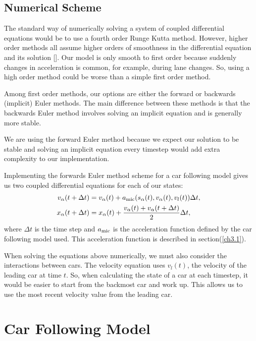 \documentclass[12pt]{article}
\begin{document}
    \subsection{Numerical Scheme}\label{num_sch}
    The standard way of numerically solving a system of coupled differential equations would be to use a fourth order Runge Kutta method.
    However, higher order methods all assume higher orders of smoothness in the differential equation and its solution [\cite{numerics}].
    Our model is only smooth to first order because suddenly changes in acceleration is common, for example, during lane changes. 
    So, using a high order method could be worse than a simple first order method.

    Among first order methods, our options are either the forward or backwards (implicit) Euler methods. The main difference between these methods is that the backwards Euler method involves solving an implicit equation and is generally more stable.

    We are using the forward Euler method because we expect our solution to be stable and solving an implicit equation every timestep would add extra complexity to our implementation.

    Implementing the forwards Euler method scheme for a car following model gives us two coupled differential equations for each of our states:
    \begin{align}
        v_\alpha(t+\Delta t) &= v_\alpha(t) +a_{\rm mic}(s_\alpha(t), v_\alpha (t), v_l (t))\Delta t, \label{num_eq1}\\
        x_\alpha(t + \Delta t) &= x_\alpha(t) + \frac{v_\alpha (t) + v_\alpha (t+\Delta t)}{2}\Delta t \label{num_eq2},
    \end{align}
    where $\Delta t$ is the time step and $a_{\rm mic}$ is the acceleration function defined by the car following model used. This acceleration function is described in section(\ref{ch3.1}).

    When solving the equations above numerically, we must also consider the interactions between cars. The velocity equation uses $v_l(t)$, the velocity of the leading car at time $t$. So, when calculating the state of a car at each timestep, it would be easier to start from the backmost car and work up. This allows us to use the most recent velocity value from the leading car.     

    \section{Car Following Model}
\end{document}
